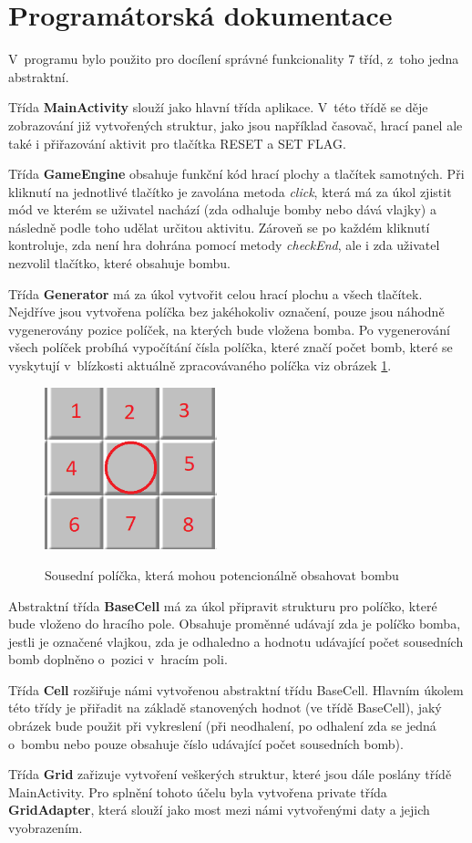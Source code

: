 \documentclass[12pt, a4paper]{article}
\begin{document}
\section{Programátorská dokumentace}
V~programu bylo použito pro docílení správné funkcionality 7 tříd, z~toho jedna abstraktní.
\par
Třída \textbf{MainActivity} slouží jako hlavní třída aplikace. V~této třídě se děje zobrazování již vytvořených struktur, jako jsou například časovač, hrací panel ale také i přiřazování aktivit pro tlačítka RESET a SET FLAG.
\par
Třída \textbf{GameEngine} obsahuje funkční kód hrací plochy a tlačítek samotných. Při kliknutí na jednotlivé tlačítko je zavolána metoda \textit{click}, která má za úkol zjistit mód ve kterém se uživatel nachází (zda odhaluje bomby nebo dává vlajky) a následně podle toho udělat určitou aktivitu. Zároveň se po každém kliknutí kontroluje, zda není hra dohrána pomocí metody \textit{checkEnd}, ale i zda uživatel nezvolil tlačítko, které obsahuje bombu.
\par
Třída \textbf{Generator} má za úkol vytvořit celou hrací plochu a všech tlačítek. Nejdříve jsou vytvořena políčka bez jakéhokoliv označení, pouze jsou náhodně vygenerovány pozice políček, na kterých bude vložena bomba. Po vygenerování všech políček probíhá vypočítání čísla políčka, které značí počet bomb, které se vyskytují v~blízkosti aktuálně zpracovávaného políčka viz obrázek \ref{fig:sousedi}.
	\begin{figure}[h!]
	\centering
	\includegraphics[width=5cm]{img/sousedi}\\
	\caption{Sousední políčka, která mohou potencionálně obsahovat bombu}
	\label{fig:sousedi}
	\end{figure}
\par
Abstraktní třída \textbf{BaseCell} má za úkol připravit strukturu pro políčko, které bude vloženo do hracího pole. Obsahuje proměnné udávají zda je políčko bomba, jestli je označené vlajkou, zda je odhaledno a hodnotu udávající počet sousedních bomb doplněno o~pozici v~hracím poli.
\par
Třída \textbf{Cell} rozšiřuje námi vytvořenou abstraktní třídu BaseCell. Hlavním úkolem této třídy je přiřadit na základě stanovených hodnot (ve třídě BaseCell), jaký obrázek bude použit při vykreslení (při neodhalení, po odhalení zda se jedná o~bombu nebo pouze obsahuje číslo udávající počet sousedních bomb).
\par
Třída \textbf{Grid} zařizuje vytvoření veškerých struktur, které jsou dále poslány třídě MainActivity. Pro splnění tohoto účelu byla vytvořena private třída \textbf{GridAdapter}, která slouží jako most mezi námi vytvořenými daty a jejich vyobrazením.
\newpage
\end{document}
